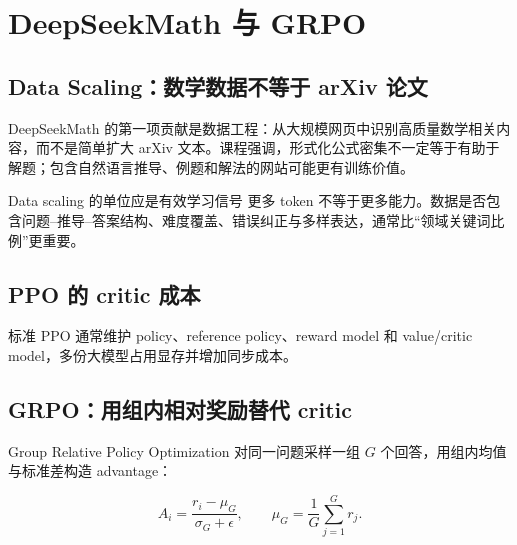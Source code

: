 \section{DeepSeekMath 与 GRPO}

\subsection{Data Scaling：数学数据不等于 arXiv 论文}

DeepSeekMath 的第一项贡献是数据工程：从大规模网页中识别高质量数学相关内容，而不是简单扩大 arXiv 文本。课程强调，形式化公式密集不一定等于有助于解题；包含自然语言推导、例题和解法的网站可能更有训练价值。




\begin{importantbox}{Data scaling 的单位应是有效学习信号}
更多 token 不等于更多能力。数据是否包含问题--推导--答案结构、难度覆盖、错误纠正与多样表达，通常比“领域关键词比例”更重要。
\end{importantbox}

\subsection{PPO 的 critic 成本}

标准 PPO 通常维护 policy、reference policy、reward model 和 value/critic model，多份大模型占用显存并增加同步成本。


\subsection{GRPO：用组内相对奖励替代 critic}

Group Relative Policy Optimization 对同一问题采样一组 $G$ 个回答，用组内均值与标准差构造 advantage：

$$
A_i=\frac{r_i-\mu_G}{\sigma_G+\epsilon},
\qquad
\mu_G=\frac{1}{G}\sum_{j=1}^{G}r_j.
$$


